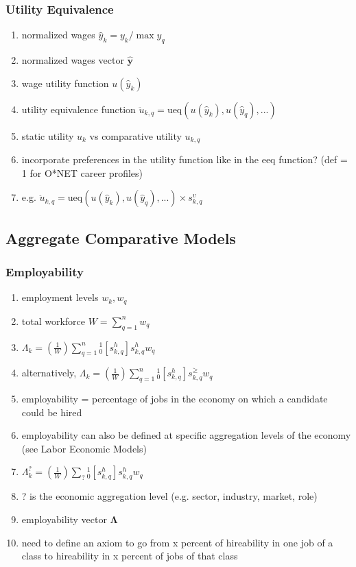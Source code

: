 \documentclass{elsarticle} %
\begin{document}
\subsubsection{Utility Equivalence}
\begin{enumerate}
    \item normalized wages $\hat{y}_k = y_k / \max y_q$
    \item normalized wages vector $\boldsymbol{\hat{y}}$
    \item wage utility function $u(\hat{y}_k)$
    \item utility equivalence function $\ddot{u}_{k,q} = \text{ueq}(u(\hat{y}_k),
              u(\hat{y}_q), ...)$
    \item static utility $u_k$ vs comparative utility $u_{k,q}$
    \item incorporate preferences in the utility function like in the eeq function? (def
          = 1 for O*NET career profiles)
    \item e.g. $\ddot{u}_{k,q} = \text{ueq}(u(\hat{y}_k), u(\hat{y}_q), ...) \times
              s_{k,q}^{\upsilon}$
\end{enumerate}

\subsection{Aggregate Comparative Models}
\subsubsection{Employability}
\begin{enumerate}
    \item employment levels $w_k, w_q$
    \item total workforce $W = \sum_{q=1}^{n}{w_q}$
    \item $\Lambda_k = \left(\frac{1}{W}\right) \sum_{q=1}^{n}{_{0}^{1}[s_{k,q}^{h}] s_{k,q}^{h} w_q}$
    \item alternatively, $\Lambda_k = \left(\frac{1}{W}\right)
              \sum_{q=1}^{n}{_{0}^{1}[s_{k,q}^{h}] s_{k,q}^{\geq} w_q}$
    \item employability = percentage of jobs in the economy on which a candidate could be
          hired
    \item employability can also be defined at specific aggregation levels of the economy
          (see Labor Economic Models)
    \item $\Lambda_{k}^{?} = \left(\frac{1}{W}\right) \sum_{?}{_{0}^{1}[s_{k,q}^{h}] s_{k,q}^{h} w_q}$
    \item ? is the economic aggregation level (e.g. sector, industry, market, role)
    \item employability vector $\boldsymbol{\Lambda}$
    \item need to define an axiom to go from x percent of hireability in one job of a
          class to hireability in x percent of jobs of that class
\end{enumerate}
\end{document}
